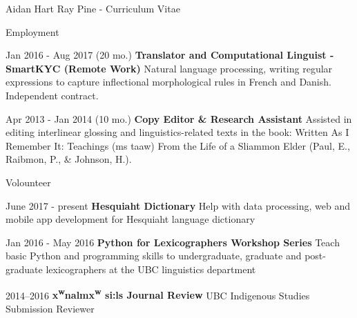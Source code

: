 \documentclass[12pt]{letter}
\begin{document}
\begin{cv}{ Aidan Hart Ray Pine  \space - \space   Curriculum Vitae}
\begin{cvlist}{Employment}
            \item[Jan 2016 - Aug 2017 (20 mo.)] \textbf{Translator and Computational Linguist - SmartKYC (Remote Work) }
            \newline Natural language processing, writing regular expressions to capture inflectional morphological rules in French and Danish. Independent contract.
            
            
            \item[Apr 2013 - Jan 2014 (10 mo.)]	\textbf{Copy Editor \& Research Assistant}
            \newline Assisted in editing interlinear glossing and linguistics-related texts in the book: Written As I Remember It: Teachings (\textglotstop \textschwa ms ta\textglotstop aw) From the Life of a Sliammon Elder (Paul, E., Raibmon, P., \& Johnson, H.).
            
            
        \end{cvlist}
        \begin{cvlist}{Volounteer}
            \item[June 2017 - present] \textbf{Hesquiaht Dictionary}
            \newline Help with data processing, web and mobile app development for Hesquiaht language dictionary
            \item[Jan 2016 - May 2016] \textbf{Python for Lexicographers Workshop Series}
            \newline Teach basic Python and programming skills to undergraduate, graduate and post-graduate lexicographers at the UBC linguistics department
            \item[2014--2016] \textbf{x\textsuperscript{w}na\textglotstop\textschwa l\textschwa mx\textsuperscript{w} s\textchi\textschwa\textchi i:ls Journal Review} 
            \newline UBC Indigenous Studies Submission Reviewer
            

\end{cvlist}
\end{cv}
\end{document}
